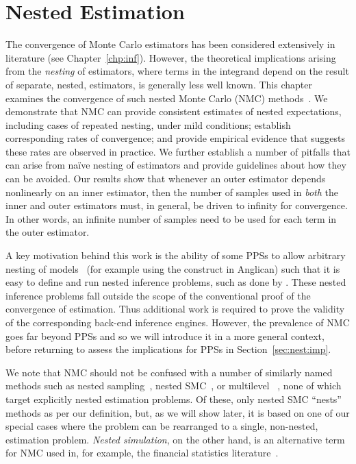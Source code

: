 
\chapter{Nested Estimation}
\label{chp:nest}

The convergence of Monte Carlo estimators has been considered extensively in 
literature (see Chapter~\ref{chp:inf}).  However, the theoretical implications
arising from the \emph{nesting} of \mc estimators, where terms in the integrand depend on the
result of separate, nested, \mc estimators, is generally less well known.
This chapter examines the convergence of such nested Monte Carlo (NMC) 
methods~\citep{rainforth2016pitfalls,rainforth2017pitfalls}.
We demonstrate that NMC can provide consistent estimates of 
nested expectations, including cases of repeated nesting, under mild conditions;
establish corresponding rates of convergence;
and provide empirical evidence that suggests these rates are observed in practice.
We further establish a number of pitfalls that can arise from na\"{i}ve nesting of \mc estimators
and provide guidelines about how they can be avoided.
Our results show that whenever an outer estimator depends nonlinearly on an inner
estimator, then the number of samples used in \emph{both} the inner and outer estimators
must, in general, be driven to infinity for convergence.  In other words, an infinite number of samples
need to be used for each term in the outer estimator.

A key motivation behind this work is the ability of some PPSs to allow
arbitrary nesting of models~\citep{mantadelis2011nesting,stuhlmuller2014reasoning} (for example using
 the \conditional construct in Anglican)
such that it is easy to define and run nested inference problems, such as done
by \citep{ouyang2016practical,le2016nested}. These nested inference problems fall outside the
scope of the conventional proof of the convergence of \mc estimation. Thus additional
work is required to prove the validity of the corresponding back-end inference engines.
However, the prevalence of NMC goes far beyond PPSs and so we will introduce it in
a more general context, before returning to assess the implications for PPSs in Section~\ref{sec:nest:imp}.

We note that NMC should not be confused with a number of similarly named methods such
as nested sampling~\citep{skilling2004nested}, nested SMC~\citep{naessethLS2015nested}, or multilevel 
\mc~\citep{heinrich2001multilevel}, none of
which target explicitly nested estimation problems.  Of these, only nested SMC ``nests'' \mc
methods as per our definition, but, as we will show later, it is based on one of our special cases
where the problem can be rearranged to a single, non-nested, estimation problem.  
\emph{Nested simulation}, on the other hand, is an alternative term for NMC
used in, for example, the financial statistics literature~\citep{gordy2010nested}.









%
%

%
